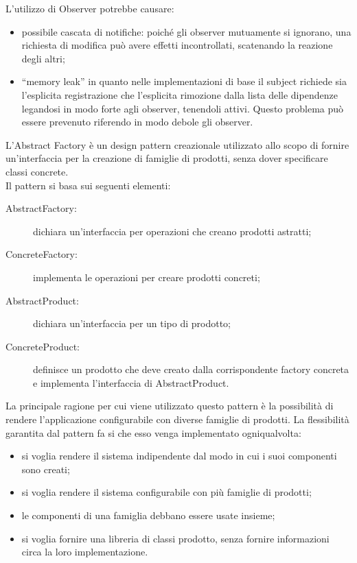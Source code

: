 			L’utilizzo di Observer potrebbe causare:
			\begin{itemize}
			\item possibile cascata di notifiche: poiché gli observer mutuamente si ignorano, una richiesta di modifica può avere effetti incontrollati, scatenando la reazione degli altri;
			\item “memory leak” in quanto nelle implementazioni di base il subject richiede sia l’esplicita registrazione che l’esplicita rimozione dalla lista delle dipendenze legandosi in modo forte agli observer, tenendoli attivi. Questo problema può essere prevenuto riferendo in modo debole gli observer.
			\end{itemize}
		 \label{app:abstractfactory}
L'Abstract Factory è un design pattern creazionale utilizzato allo scopo di fornire un'interfaccia per la creazione di famiglie di prodotti, senza dover specificare classi concrete.\\
Il pattern si basa sui seguenti elementi:
\begin{description}
\item[AbstractFactory:] dichiara un'interfaccia per operazioni che creano prodotti astratti;
\item[ConcreteFactory:] implementa le operazioni per creare prodotti concreti;
\item[AbstractProduct:] dichiara un'interfaccia per un tipo di prodotto;
\item[ConcreteProduct:] definisce un prodotto che deve creato dalla corrispondente factory concreta e implementa l'interfaccia di AbstractProduct.
\end{description}
La principale ragione per cui viene utilizzato questo pattern è la possibilità di rendere l'applicazione configurabile con diverse famiglie di prodotti. La flessibilità garantita dal pattern fa si che esso venga implementato ogniqualvolta:
\begin{itemize}
\item si voglia rendere il sistema indipendente dal modo in cui i suoi componenti sono creati;
\item si voglia rendere il sistema configurabile con più famiglie di prodotti;
\item le componenti di una famiglia debbano essere usate insieme;
\item si voglia fornire una libreria di classi prodotto, senza fornire informazioni circa la loro implementazione.
\end{itemize}

